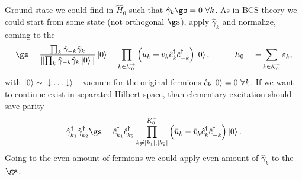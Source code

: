 Ground state we could find in $\hat{H}_0$ such that $\hat{\gamma}_k \gs = 0 \ \forall k$. As in BCS theory we could start from some state (not orthogonal $\gs$), apply $\hat{\gamma}_k$ and normalize, coming to the
\begin{equation*}
	\gs = \frac{\prod_k \hat{\gamma}_{-k} \hat{\gamma}_k}{\left\|\prod_k \hat{\gamma}_{-k} \hat{\gamma}_k \ket{0}\right\|} \ket{0} = \prod_{k \in \mathcal K^+_0} \left(u_k + v_k \hat{c}_k\D \hat{c}\D_{-k}\right) \ket{0},
	\hspace{10 mm} 
	E_0 = - \sum_{k \in \mathcal K^+_0} \varepsilon_k,
\end{equation*}
with $\left| 0 \right\rangle \sim \left| \downarrow\ldots\downarrow \right\rangle$ -- vacuum for the original fermions $\hat{c}_k \left| 0 \right\rangle = 0 \ \forall k$. 
 If we want to continue exist in separated Hilbert space, than elementary excitation should save parity
\begin{equation*}
    \hat{\gamma}_{k_1}\D \hat{\gamma}_{k_2}\D \gs = \hat{c}_{k_1}\D \hat{c}_{k_2}\D \prod_{k \neq |k_1|,|k_2|}^{K^+_0} \left(\bar{u}_k - \bar{v}_k \hat{c}\D_k \hat{c}_{-k}\D \right) \ket{0}.
\end{equation*}
Going to the even amount of fermions we could apply even amount of $\hat{\gamma}_k$ to the $\gs$.